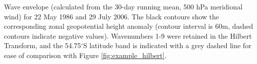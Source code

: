 \label{fig:example_envelope}
Wave envelope (calculated from the 30-day running mean, 500 hPa meridional wind) for 22 May 1986 and 29 July 2006. The black contours show the corresponding zonal geopotential height anomaly (contour interval is 60m, dashed contours indicate negative values). Wavenumbers 1-9 were retained in the Hilbert Transform, and the 54.75$^{\circ}$S latitude band is indicated with a grey dashed line for ease of comparison with Figure \ref{fig:example_hilbert}. 